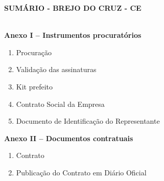 \documentclass{article}
\author{}
\date{}
\begin{document}
\textbf{SUMÁRIO - BREJO DO CRUZ - CE}\\
\strut \\
\textbf{Anexo I -- Instrumentos procuratórios }
\begin{enumerate}
    \item Procuração 
    \item Validação das assinaturas 
    \item Kit prefeito 
    \item Contrato Social da Empresa 
    \item Documento de Identificação do Representante 
\end{enumerate}
\textbf{Anexo II -- Documentos contratuais }
\begin{enumerate}
    \item Contrato 
    \item Publicação do Contrato em Diário Oficial 
\end{enumerate}
\end{document}
